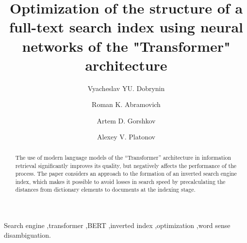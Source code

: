 \documentclass[
    twocolumn,
]{template/ceurart}
\begin{document}
    \title{Optimization of the structure of a full-text search index using neural networks of the "Transformer" architecture}
    \author[1]{Vyacheslav YU. Dobrynin}
    \author[1]{Roman K. Abramovich}
    \author[1]{Artem D. Gorshkov}
    \author[1]{Alexey V. Platonov}
    \address[1]{ITMO University, Kronverksky Pr. 49, bldg. A, Saint-Petersburg, 197101, Russian Federation}
    \begin{abstract}
        The use of modern language models of the ``Transformer'' architecture in information retrieval significantly
        improves its quality, but negatively affects the performance of the process.
        The paper considers an approach to the formation of an inverted search engine index,
        which makes it possible to avoid losses in search speed by precalculating the distances from dictionary
        elements to documents at the indexing stage.
    \end{abstract}
    \begin{keywords}
        Search engine \sep transformer \sep BERT \sep inverted index \sep optimization \sep word sense disambiguation.
    \end{keywords}
    \maketitle
\end{document}
